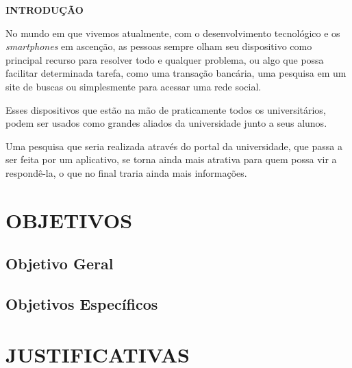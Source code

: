 \vspace{1.2em}
\textbf{\large INTRODUÇÃO}

\vspace{2.9em}
\thispagestyle{empty}


\par No mundo em que vivemos atualmente, com o desenvolvimento tecnológico e os \textit{smartphones} em ascenção, as pessoas sempre olham seu dispositivo como principal recurso para resolver todo e qualquer problema, ou algo que possa facilitar determinada tarefa, como uma transação bancária, uma pesquisa em um site de buscas ou simplesmente para acessar uma rede social.
\par Esses dispositivos que estão na mão de praticamente todos os universitários, podem ser usados como grandes aliados da universidade junto a seus alunos.
\par Uma pesquisa que seria realizada através do portal da universidade, que passa a ser feita por um aplicativo, se torna ainda mais atrativa para quem possa vir a respondê-la, o que no final traria ainda mais informações.


\chapter{OBJETIVOS}


\section{Objetivo Geral}


\section{Objetivos Específicos}

\chapter{JUSTIFICATIVAS}

